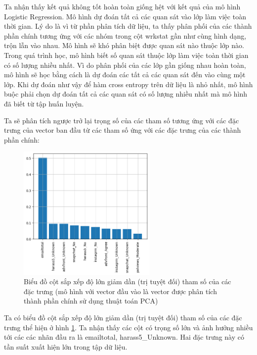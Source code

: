 \begin{enumerate}[label=(\alph*)]
    Ta nhận thấy kết quả không tốt hoàn toàn giống hệt với kết quả của mô hình Logistic Regression.
    Mô hình dự đoán tất cả các quan sát vào lớp làm việc toàn thời gian.
    Lý do là vì từ phần phân tích dữ liệu, ta thấy phân phối của các thành phần chính tương ứng với các nhóm trong cột wrkstat gần như cùng hình dạng, trộn lẫn vào nhau.
    Mô hình sẽ khó phân biệt được quan sát nào thuộc lớp nào.
    Trong quá trình học, mô hình biết số quan sát thuộc lớp làm việc toàn thời gian có số lượng nhiều nhất.
    Vì do phân phối của các lớp gần giống nhau hoàn toàn, mô hình sẽ học bằng cách là dự đoán các tất cả các quan sát đến vào cùng một lớp.
    Khi dự đoán như vậy để hàm cross entropy trên dữ liệu là nhỏ nhất, mô hình buộc phải chọn dự đoán tất cả các quan sát có số lượng nhiều nhất mà mô hình đã biết từ tập huấn luyện.

    Ta sẽ phân tích ngược trở lại trọng số của các tham số tương ứng với các đặc trưng của vector ban đầu từ các tham số ứng với các đặc trưng của các thành phần chính:

    \begin{figure}[H]
        \centering
        \includegraphics[width=0.6\textwidth]{figures/Thanh/Models/Random_Forest/Non_null_models_Feature_Importance_Random_Forest_PCA_features.png}
        \caption{Biểu đồ cột sắp xếp độ lớn giảm dần (trị tuyệt đối) tham số của các đặc trưng (mô hình với vector đầu vào là vector được phân tích thành phần chính sử dụng thuật toán PCA)}
        \label{fig:Non_null_models_Feature_Importance_Random_Forest_PCA_features}
    \end{figure}
    
    Ta có biểu đồ cột sắp xếp độ lớn giảm dần (trị tuyệt đối) tham số của các đặc trưng thể hiện ở hình \ref{fig:Non_null_models_Feature_Importance_Random_Forest_PCA_features}.
    Ta nhận thấy các cột có trọng số lớn và ảnh hưởng nhiều tới các các nhãn đầu ra là emailtotal, harass5\_Unknown.
    Hai đặc trưng này có tần suất xuất hiện lớn trong tập dữ liệu.


\end{enumerate}

